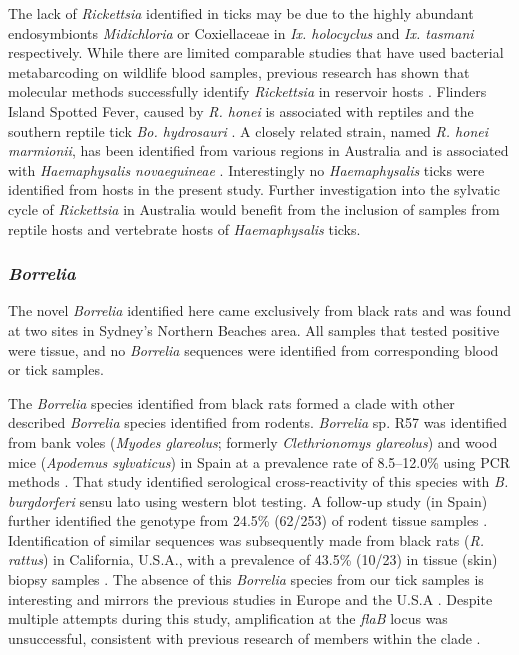 \documentclass[a4paper, nobind]{templates/ociamthesis}
\begin{document}
The lack of \emph{Rickettsia} identified in ticks may be due to the highly abundant endosymbionts \emph{Midichloria} or Coxiellaceae in \emph{Ix. holocyclus} and \emph{Ix. tasmani} respectively.
While there are limited comparable studies that have used bacterial metabarcoding on wildlife blood samples, previous research has shown that molecular methods successfully identify \emph{Rickettsia} in reservoir hosts \autocite{ndeerehMolecularSurveillanceSpotted2017,martelloBorreliaBurgdorferiSensu2019,chaorattanakaweeAmpliconBasedNextGeneration2021}. Flinders Island Spotted Fever, caused by \emph{R. honei} is associated with reptiles and the southern reptile tick \emph{Bo. hydrosauri} \autocite{stenosAponommaHydrosauriReptileassociated2003}.
A closely related strain, named \emph{R. honei marmionii}, has been identified from various regions in Australia and is associated with \emph{Haemaphysalis novaeguineae} \autocite{laneEvidenceSpottedFeverlike2005a,unsworthFlindersIslandSpotted2007}.
Interestingly no \emph{Haemaphysalis} ticks were identified from hosts in the present study.
Further investigation into the sylvatic cycle of \emph{Rickettsia} in Australia would benefit from the inclusion of samples from reptile hosts and vertebrate hosts of \emph{Haemaphysalis} ticks.

\hypertarget{borrelia-3}{%
\subsubsection{\texorpdfstring{\emph{Borrelia}}{Borrelia}}\label{borrelia-3}}

The novel \emph{Borrelia} identified here came exclusively from black rats and was found at two sites in Sydney's Northern Beaches area. All samples that tested positive were tissue, and no \emph{Borrelia} sequences were identified from corresponding blood or tick samples.

The \emph{Borrelia} species identified from black rats formed a clade with other described \emph{Borrelia} species identified from rodents. \emph{Borrelia} sp. R57 was identified from bank voles (\emph{Myodes glareolus}; formerly \emph{Clethrionomys glareolus}) and wood mice (\emph{Apodemus sylvaticus}) in Spain at a prevalence rate of 8.5--12.0\% using PCR methods \autocite{gilIdentificationNewBorrelia2005}.
That study identified serological cross-reactivity of this species with \emph{B. burgdorferi} sensu lato using western blot testing.
A follow-up study (in Spain) further identified the genotype from 24.5\% (62/253) of rodent tissue samples \autocite{barandikaTickBorneZoonoticBacteria2007}.
Identification of similar sequences was subsequently made from black rats (\emph{R. rattus}) in California, U.S.A., with a prevalence of 43.5\% (10/23) in tissue (skin) biopsy samples \autocite{fedorovaRemarkableDiversityTick2014}.
The absence of this \emph{Borrelia} species from our tick samples is interesting and mirrors the previous studies in Europe and the U.S.A \autocite{gilIdentificationNewBorrelia2005,fedorovaRemarkableDiversityTick2014}.
Despite multiple attempts during this study, amplification at the \emph{flaB} locus was unsuccessful, consistent with previous research of members within the clade \autocite{gilIdentificationNewBorrelia2005}.
\end{document}
